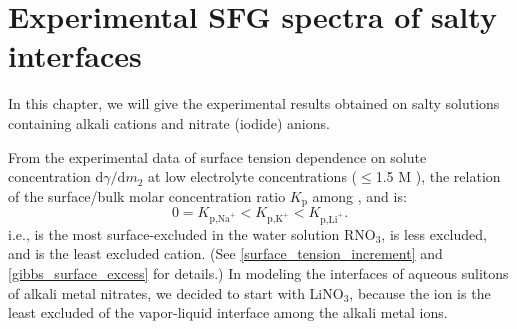 \chapter{Experimental SFG spectra of salty interfaces}\label{CHAPTER_SFG_Exp}
In this chapter, we will give the experimental results obtained on salty solutions containing alkali cations and nitrate (iodide) anions. \cite{PS03,AJ12,HuaWei2014} 

From the experimental data of surface tension dependence on solute concentration $\text{d}\gamma/\text{d}m_2$ 
at low electrolyte concentrations ($\leq$1.5 M ), \cite{Weissenborn95,Hey81,Jarvis68,Jarvis72} 
the relation of the surface/bulk molar concentration ratio $K_{\text{p}}$ \cite{Pegram2006} among \li, \Na and \K is: 
\begin{equation}
0=K_{\text{p,Na}^+}< K_{\text{p,K}^+}< K_{\text{p,Li}^+}.
\label{eq:bscr}
\end{equation}
i.e., \Na is the most surface-excluded in the water solution RNO$_3$, \K is less excluded, 
and \Li is the least excluded cation. (See \ref{surface_tension_increment} and \ref{gibbs_surface_excess} for details.)
In modeling the interfaces of aqueous sulitons of alkali metal nitrates, we decided to start with LiNO$_3$, because the \Li ion is the least excluded of the vapor-liquid interface 
among the alkali metal ions. 
%
%

